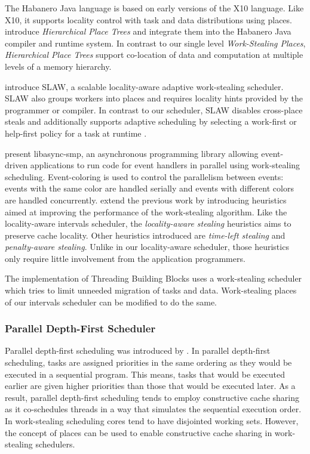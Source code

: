 The Habanero Java \cite{HJ} language is based on early versions of the
X10 language. Like X10, it supports locality control with task and
data distributions using places. \textcite{Yan2009} introduce
\emph{Hierarchical Place Trees} and integrate them into the Habanero
Java compiler and runtime system. In contrast to our single level
\emph{Work-Stealing Places}, \emph{Hierarchical Place Trees} support
co-location of data and computation at multiple levels of a memory
hierarchy.

\textcite{Guo2010} introduce SLAW, a scalable locality-aware adaptive
work-stealing scheduler. SLAW also groups workers into places and
requires locality hints provided by the programmer or compiler. In
contrast to our scheduler, SLAW disables cross-place steals and
additionally supports adaptive scheduling by selecting a work-first or
help-first policy for a task at runtime \cite{Guo2009}.

\textcite{Zeldovich2003} present libasync-smp, an asynchronous
programming library allowing event-driven applications to run code for
event handlers in parallel using work-stealing
scheduling. Event-coloring is used to control the parallelism between
events: events with the same color are handled serially and events
with different colors are handled concurrently. \textcite{Gaud2010}
extend the previous work by introducing heuristics aimed at improving
the performance of the work-stealing algorithm. Like the
locality-aware intervals scheduler, the \emph{locality-aware stealing}
heuristics aims to preserve cache locality. Other heuristics
introduced are \emph{time-left stealing} and \emph{penalty-aware
  stealing}. Unlike in our locality-aware scheduler, those heuristics
only require little involvement from the application programmers.

The implementation of Threading Building Blocks \cite{Contreras2008,
  Reinders2007} uses a work-stealing scheduler which tries to limit
unneeded migration of tasks and data. Work-stealing places of our
intervals scheduler can be modified to do the same.

\subsubsection{Parallel Depth-First Scheduler}

Parallel depth-first scheduling was introduced by
\textcite{Blelloch1999}. In parallel depth-first scheduling, tasks are
assigned priorities in the same ordering as they would be executed in
a sequential program. This means, tasks that would be executed earlier
are given higher priorities than those that would be executed
later. As a result, parallel depth-first scheduling tends to employ
constructive cache sharing \cite{Liaskovitis2006, Chen2007} as it
co-schedules threads in a way that simulates the sequential execution
order. In work-stealing scheduling cores tend to have disjointed
working sets. However, the concept of places can be used to enable
constructive cache sharing in work-stealing schedulers.


